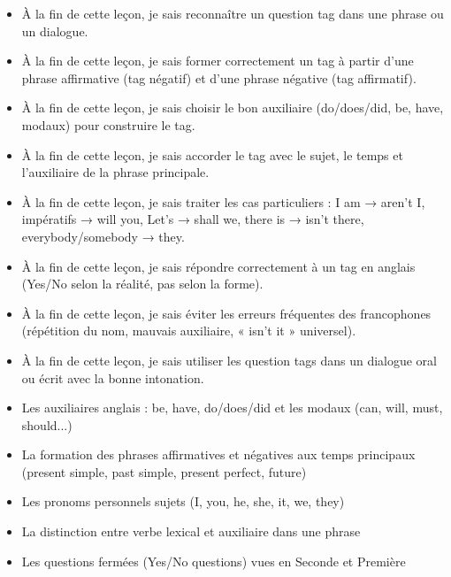 \documentclass[11pt]{article}
\begin{document}
\begin{objectifs}
\begin{itemize}
\item À la fin de cette leçon, je sais reconnaître un question tag dans une phrase ou un dialogue.
\item À la fin de cette leçon, je sais former correctement un tag à partir d'une phrase affirmative (tag négatif) et d'une phrase négative (tag affirmatif).
\item À la fin de cette leçon, je sais choisir le bon auxiliaire (do/does/did, be, have, modaux) pour construire le tag.
\item À la fin de cette leçon, je sais accorder le tag avec le sujet, le temps et l'auxiliaire de la phrase principale.
\item À la fin de cette leçon, je sais traiter les cas particuliers : I am → aren't I, impératifs → will you, Let's → shall we, there is → isn't there, everybody/somebody → they.
\item À la fin de cette leçon, je sais répondre correctement à un tag en anglais (Yes/No selon la réalité, pas selon la forme).
\item À la fin de cette leçon, je sais éviter les erreurs fréquentes des francophones (répétition du nom, mauvais auxiliaire, « isn't it » universel).
\item À la fin de cette leçon, je sais utiliser les question tags dans un dialogue oral ou écrit avec la bonne intonation.
\end{itemize}
\end{objectifs}

\begin{prerequis}
\begin{itemize}
\item Les auxiliaires anglais : be, have, do/does/did et les modaux (can, will, must, should...)
\item La formation des phrases affirmatives et négatives aux temps principaux (present simple, past simple, present perfect, future)
\item Les pronoms personnels sujets (I, you, he, she, it, we, they)
\item La distinction entre verbe lexical et auxiliaire dans une phrase
\item Les questions fermées (Yes/No questions) vues en Seconde et Première
\end{itemize}
\end{prerequis}

\newpage
\end{document}
